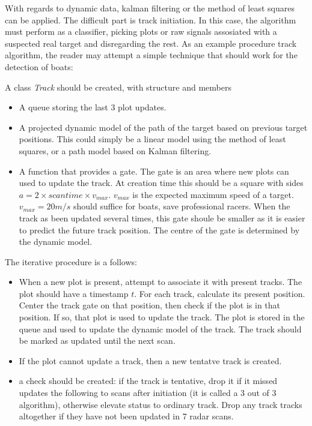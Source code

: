 \documentclass[letterpaper]{book}
\begin{document}
With regards to dynamic data, kalman filtering or the method of least squares can be applied. The difficult part is track initiation. In this case, the algorithm must perform as a classifier, picking plots or raw signals assosiated with a suspected real target and disregarding the rest. As an example procedure track algorithm, the reader may attempt a simple technique that should work for the detection of boats: 

A class \textit{Track} should be created, with structure and members
\begin{itemize}
\item A queue storing the last 3 plot updates.
\item A projected dynamic model of the path of the target based on previous target positions. This could simply be a linear model using the method of least squares, or a path model based on Kalman filtering.
\item A function that provides a gate. The gate is an area where new plots can used to update the track. At creation time this should be a square with sides \(a = 2 \times scantime \times v_{max}\). \(v_{max}\) is the expected maximum speed of a target. \(v_{max} = 20m/s\) should suffice for boats, save professional racers. When the track as been updated several times, this gate shoule be smaller as it is easier to predict the future track position. The centre of the gate is determined by the dynamic model. 
\end{itemize}

The iterative procedure is a follows: 
\begin{itemize}
\item When a new plot is present, attempt to associate it with present tracks. The plot should have a timestamp \(t\). For each track, calculate its present position. Center the track gate on that position, then check if the plot is in that position. If so, that plot is used to update the track. The plot is stored in the queue and used to update the dynamic model of the track. The track should be marked as updated until the next scan. 
\item If the plot cannot update a track, then a new tentatve track is created. 
\item a check should be created: if the track is tentative, drop it if it missed updates the following to scans after initiation (it is called a 3 out of 3 algorithm), otherwise elevate status to ordinary track. Drop any track tracks altogether if they have not been updated in 7 radar scans.
\end{itemize}
\end{document}
